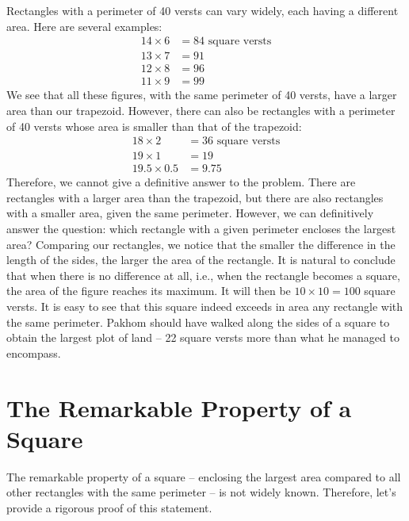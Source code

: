 \ques Rectangles with a perimeter of 40 versts can vary widely, each having a different area. Here are several examples:
\begin{align*}%
14 \times 6 & = 84 \,\, \text{square versts}\\
13 \times 7 & = 91 \\
12 \times 8 & = 96 \\
11 \times 9 & = 99
\end{align*}
We see that all these figures, with the same perimeter of 40 versts, have a larger area than our trapezoid. However, there can also be rectangles with a perimeter of 40 versts whose area is smaller than that of the trapezoid:
\begin{align*}%
18 \times 2 & = 36 \,\, \text{square versts}\\
19 \times 1 & = 19 \\
19.5 \times 0.5 & = 9.75
\end{align*}
Therefore, we cannot give a definitive answer to the problem. There are rectangles with a larger area than the trapezoid, but there are also rectangles with a smaller area, given the same perimeter. However, we can definitively answer the question: which rectangle with a given perimeter encloses the largest area? Comparing our rectangles, we notice that the smaller the difference in the length of the sides, the larger the area of the rectangle. It is natural to conclude that when there is no difference at all, i.e., when the rectangle becomes a square, the area of the figure reaches its maximum. It will then be $10 \times 10 = 100$ square versts. It is easy to see that this square indeed exceeds in area any rectangle with the same perimeter. Pakhom should have walked along the sides of a square to obtain the largest plot of land -- 22 square versts more than what he managed to encompass.
\clearpage

\section{The Remarkable Property of a Square}
\label{sec-12.4}

The remarkable property of a square -- enclosing the largest area compared to all other rectangles with the same perimeter -- is not widely known. Therefore, let's provide a rigorous proof of this statement.

